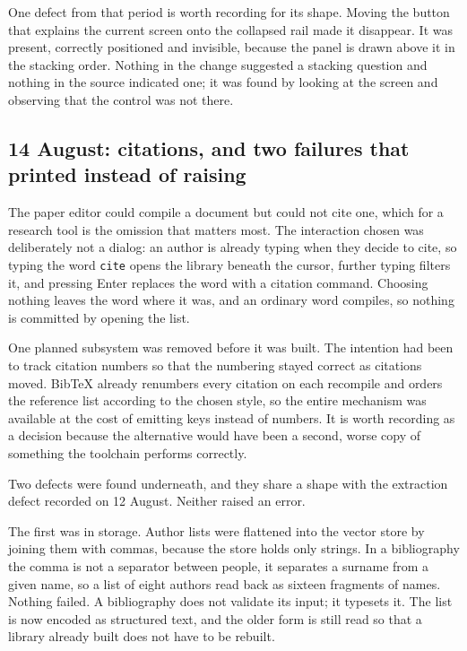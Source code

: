 \documentclass[11pt,a4paper]{article}
\begin{document}
One defect from that period is worth recording for its shape. Moving the
button that explains the current screen onto the collapsed rail made it
disappear. It was present, correctly positioned and invisible, because the
panel is drawn above it in the stacking order. Nothing in the change suggested
a stacking question and nothing in the source indicated one; it was found by
looking at the screen and observing that the control was not there.

\subsection{14 August: citations, and two failures that printed instead of raising}

The paper editor could compile a document but could not cite one, which for a
research tool is the omission that matters most. The interaction chosen was
deliberately not a dialog: an author is already typing when they decide to cite,
so typing the word \texttt{cite} opens the library beneath the cursor, further
typing filters it, and pressing Enter replaces the word with a citation command.
Choosing nothing leaves the word where it was, and an ordinary word compiles, so
nothing is committed by opening the list.

One planned subsystem was removed before it was built. The intention had been to
track citation numbers so that the numbering stayed correct as citations moved.
BibTeX already renumbers every citation on each recompile and orders the
reference list according to the chosen style, so the entire mechanism was
available at the cost of emitting keys instead of numbers. It is worth recording
as a decision because the alternative would have been a second, worse copy of
something the toolchain performs correctly.

Two defects were found underneath, and they share a shape with the extraction
defect recorded on 12 August. Neither raised an error.

The first was in storage. Author lists were flattened into the vector store by
joining them with commas, because the store holds only strings. In a
bibliography the comma is not a separator between people, it separates a surname
from a given name, so a list of eight authors read back as sixteen fragments of
names. Nothing failed. A bibliography does not validate its input; it typesets
it. The list is now encoded as structured text, and the older form is still read
so that a library already built does not have to be rebuilt.
\end{document}
